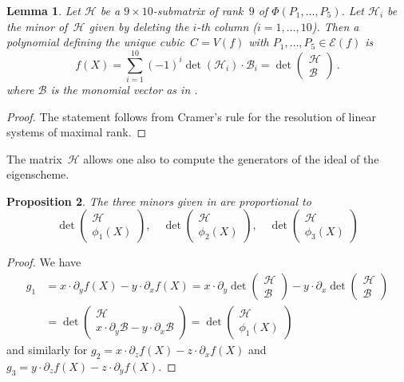 \documentclass[a4paper, 11pt, reqno]{amsart}
\theoremstyle{plain}
\newtheorem{lemma}{Lemma}[section]
\newtheorem{prop}[lemma]{Proposition}
\theoremstyle{definition}
\newcommand{\de}{\partial}
\newcommand{\Eig}[1]{\mathcal{E}\!\left( {#1} \right)}
\begin{document}
\begin{lemma}
\label{lemma:construct_cubic}
Let $\mathcal{H}$ be a $9 \times 10$-submatrix of rank~$9$ of $\Phi(P_1, \dots, P_5)$.
Let $\mathcal{H}_i$ be the minor of~$\mathcal{H}$ given by deleting the $i$-th column ($i=1, \dots, 10$).
Then a polynomial defining the unique cubic~$C=V(f)$ with $P_1, \dotsc, P_5 \in \Eig{f}$ is 
%
\[
  f(X) = \sum_{i=1}^{10}(-1)^i\det(\mathcal{H}_i)\cdot \mathcal{B}_i 
  = \det \left( 
  \begin{array}{c} \mathcal{H} \\ \mathcal{B} \end{array}
  \right) \,.
\]
%
where $\mathcal{B}$ is the monomial vector as in . 
\end{lemma}
\begin{proof}
 The statement follows from Cramer's rule for the resolution of linear systems of maximal rank.
\end{proof}

The matrix~$\mathcal{H}$ allows one also to compute the generators of the ideal of the eigenscheme.

\begin{prop}
\label{proposition:geiser1}
The three minors given in  are proportional to
%
\[
  \det \left( 
  \begin{array}{c} \mathcal{H} \\ \phi_1(X) \end{array}
  \right),\quad
  \det \left( 
  \begin{array}{c} \mathcal{H} \\ \phi_2(X) \end{array}
  \right), \quad
  \det \left( 
  \begin{array}{c} \mathcal{H} \\ \phi_3(X) \end{array}
  \right)
\]
%
\end{prop}
\begin{proof} 
We have
%
\begin{align*}
  g_1 & = x \cdot \de_y f(X)- y \cdot \de_x f(X)  =
  x \cdot \de_y \det \left(
  \begin{array}{c} \mathcal{H} \\ \mathcal{B} \end{array} 
  \right) - y \cdot
  \de_x \det \left(
  \begin{array}{c} \mathcal{H} \\ \mathcal{B} \end{array}
  \right) \\
  & = \det \left(
  \begin{array}{c} \mathcal{H} \\ x \cdot \de_y \mathcal{B} - y \cdot \de_x \mathcal{B} \end{array}
  \right)  = \det \left(
  \begin{array}{c} \mathcal{H} \\ \phi_1(X) \end{array}
  \right)
\end{align*}
%
and similarly for $g_2 = x \cdot \de_z f(X)- z \cdot \de_x f(X)$
and $g_3 = y \cdot \de_z f(X)- z \cdot \de_y f(X)$.
\end{proof}
\end{document}
